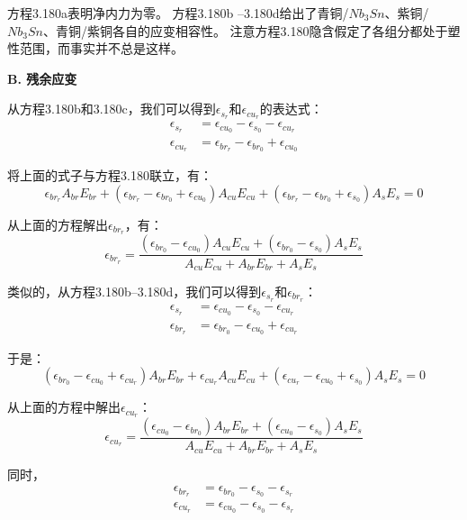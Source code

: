 方程3.180a表明净内力为零。
方程3.180b –3.180d给出了青铜/$Nb_3Sn$、紫铜/$Nb_3Sn$、青铜/紫铜各自的应变相容性。
注意方程3.180隐含假定了各组分都处于塑性范围，而事实并不总是这样。

\textbf{B. 残余应变}

从方程3.180b和3.180c，我们可以得到$\epsilon_{s_r}$和$\epsilon_{cu_r}$的表达式：
\begin{eqnarray*}%
\epsilon_{s_r}&=\epsilon_{cu_0}-\epsilon_{s_0}-\epsilon_{cu_r}\\
\epsilon_{cu_r}&=\epsilon_{br_r}-\epsilon_{br_0}+\epsilon_{cu_0}
\end{eqnarray*}

将上面的式子与方程3.180联立，有：
\begin{equation*}
\epsilon_{br_r}A_{br}E_{br}+(\epsilon_{br_r}-\epsilon_{br_0}+\epsilon_{cu_0})A_{cu}E_{cu}+(\epsilon_{br_r}-\epsilon_{br_0}+\epsilon_{s_0})A_sE_s=0
\end{equation*}

从上面的方程解出$\epsilon_{br_r}$，有：
 \begin{equation}%
\epsilon_{br_r}=\frac{(\epsilon_{br_0}-\epsilon_{cu_0})A_{cu}E_{cu}+(\epsilon_{br_0}-\epsilon_{s_0})A_sE_s}{A_{cu}E_{cu}+A_{br}E_{br}+A_{s}E_{s}}
\end{equation}

类似的，从方程3.180b–3.180d，我们可以得到$\epsilon_{s_r}$和$\epsilon_{br_r}$：
\begin{eqnarray*}
\epsilon_{s_r}&=\epsilon_{cu_0}-\epsilon_{s_0}-\epsilon_{cu_r}\\
\epsilon_{br_r}&=\epsilon_{br_0}-\epsilon_{cu_0}+\epsilon_{cu_r}
\end{eqnarray*}

于是：
\begin{equation*}
(\epsilon_{br_0}-\epsilon_{cu_0}+\epsilon_{cu_r})A_{br}E_{br}+\epsilon_{cu_r}A_{cu}E_{cu}+(\epsilon_{cu_r}-\epsilon_{cu_0}+\epsilon_{s_0})A_sE_s=0
\end{equation*}

从上面的方程中解出$\epsilon_{cu_r}$：
\begin{equation}%
\epsilon_{cu_r}=\frac{(\epsilon_{cu_0}-\epsilon_{br_0})A_{br}E_{br}+(\epsilon_{cu_0}-\epsilon_{s_0})A_sE_s}{A_{cu}E_{cu}+A_{br}E_{br}+A_{s}E_{s}}
\end{equation}

同时，
\begin{eqnarray*}
\epsilon_{br_r}&=\epsilon_{br_0}-\epsilon_{s_0}-\epsilon_{s_r}\\
\epsilon_{cu_r}&=\epsilon_{cu_0}-\epsilon_{s_0}-\epsilon_{s_r}
\end{eqnarray*}

